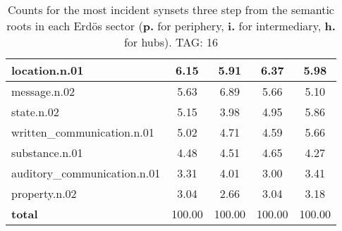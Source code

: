 \begin{table}[h!]
\begin{center}
\begin{tabular}{| l || c | c | c | c |}
location.n.01 & 6.15  & 5.91  & 6.37  & 5.98 \\\hline
message.n.02 & 5.63  & 6.89  & 5.66  & 5.10 \\\hline
state.n.02 & 5.15  & 3.98  & 4.95  & 5.86 \\\hline
written\_communication.n.01 & 5.02  & 4.71  & 4.59  & 5.66 \\\hline
substance.n.01 & 4.48  & 4.51  & 4.65  & 4.27 \\\hline
auditory\_communication.n.01 & 3.31  & 4.01  & 3.00  & 3.41 \\\hline
property.n.02 & 3.04  & 2.66  & 3.04  & 3.18 \\\hline\hline
{{\bf total}} & 100.00  & 100.00  & 100.00  & 100.00 \\\hline
\end{tabular}
\caption{Counts for the most incident synsets three step from the semantic roots in each Erd\"os sector ({\bf p.} for periphery, {\bf i.} for intermediary, {\bf h.} for hubs). TAG: 16}
\end{center}
\end{table}